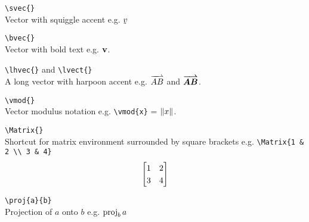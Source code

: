 \documentclass[Book Template.tex]{subfiles}
\begin{document}
                \verb+\svec{}+\\
                Vector with squiggle accent e.g. $\svec{v}$

                \verb+\bvec{}+\\
                Vector with bold text e.g. $\bvec{v}$.

                \verb+\lhvec{}+ and \verb+\lvect{}+\\
                A long vector with harpoon accent e.g. $\lhvec{AB}$ and $\lvect{AB}$.

                \verb+\vmod{}+\\
                Vector modulus notation e.g. \verb+\vmod{x}+ = $\vmod{x}$.

                \verb+\Matrix{}+\\
                Shortcut for matrix environment surrounded by square brackets e.g. \verb+\Matrix{1 & 2 \\ 3 & 4}+
                \begin{equation*}
                    \Matrix{1 & 2 \\ 3 & 4}
                \end{equation*}

                \verb+\proj{a}{b}+\\
                Projection of $a$ onto $b$ e.g. $\proj{a}{b}$
    
\end{document}
